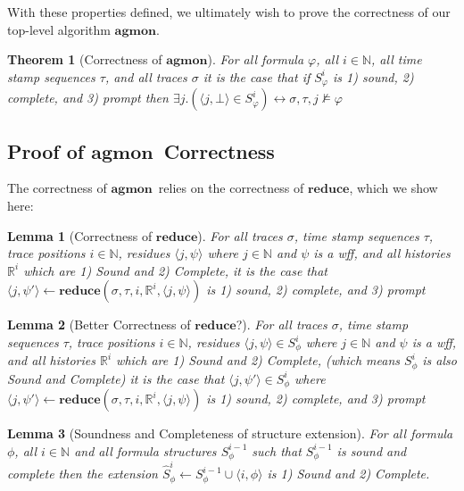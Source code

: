 \documentclass[10pt,a4paper]{article}
\newcommand{\rp}[2]{\ensuremath{\langle #1, #2 \rangle}}
\newcommand{\agmon}{\ensuremath{\mathbf{agmon}}}
\newtheorem{thm}{Theorem}
\newtheorem{lemma}{Lemma}
\begin{document}
With these properties defined, we ultimately wish to prove the correctness of our top-level algorithm \agmon.

\begin{thm}[Correctness of \agmon]
For all formula $\varphi$, all $i \in \mathbb{N}$, all time stamp sequences $\tau$, and all traces $\sigma$ it is the case that if $S^i_{\varphi}$ is 1) sound, 2) complete, and 3) prompt then $\exists j.(\rp{j}{\bot} \in S^i_{\varphi}) \leftrightarrow \sigma, \tau, j \nvDash \varphi$
\end{thm}

\subsection{Proof of \agmon\ Correctness}
The correctness of \agmon\ relies on the correctness of $\mathbf{reduce}$, which we show here:
\begin{lemma}[Correctness of $\mathbf{reduce}$]
For all traces $\sigma$, time stamp sequences $\tau$, trace positions $i \in \mathbb{N}$, residues $\rp{j}{\psi}$ where $j \in \mathbb{N}$ and $\psi$ is a wff, and all histories $\mathbb{R}^i$ which are 1) Sound and 2) Complete,
%
it is the case that $\rp{j}{\psi'} \leftarrow \mathbf{reduce}(\sigma,\tau,i,\mathbb{R}^i, \rp{j}{\psi})$ is 1) sound, 2) complete, and 3) prompt
\end{lemma}

\begin{lemma}[Better Correctness of $\mathbf{reduce}$?]
For all traces $\sigma$, 
time stamp sequences $\tau$, 
trace positions $i \in \mathbb{N}$, 
residues $\rp{j}{\psi} \in S^i_{\phi}$ where $j \in \mathbb{N}$ and $\psi$ is a wff, 
and all histories $\mathbb{R}^i$ which are 1) Sound and 2) Complete, (which means $S^i_{\phi}$ is also Sound and Complete)
%
it is the case that $\rp{j}{\psi'} \in S^i_{\phi}$ where $ \rp{j}{\psi'} \leftarrow \mathbf{reduce}(\sigma,\tau,i,\mathbb{R}^i, \rp{j}{\psi})$ is 1) sound, 2) complete, and 3) prompt

\end{lemma}


\begin{lemma}[Soundness and Completeness of structure extension]
For all formula $\phi$, all $i \in \mathbb{N}$ and all formula structures $S^{i-1}_{\phi}$ such that $S^{i-1}_{\phi}$ is sound and complete then the extension $\hat{S}^{i}_{\phi} \leftarrow S^{i-1}_{\phi} \cup \rp{i}{\phi}$ is 1) Sound and 2) Complete.
\end{lemma}
\end{document}
